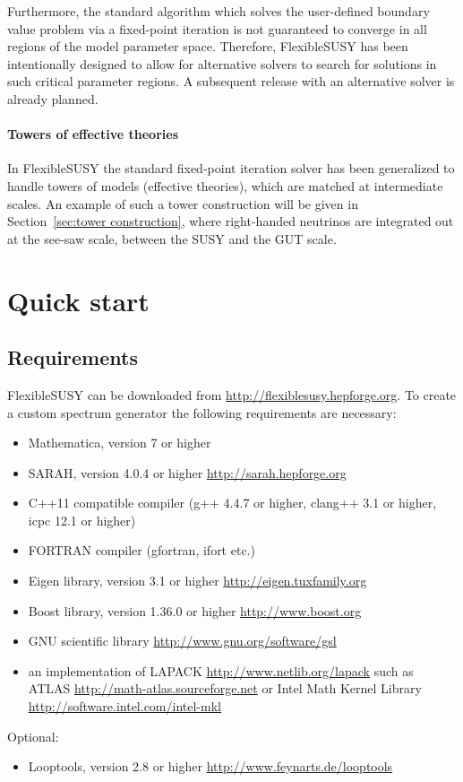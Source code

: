 \documentclass[final,3p,11pt,pdflatex]{elsarticle}
\makeatletter
\newcommand{\fs}{FlexibleSUSY\@\xspace}
\newcommand{\mathematica}{Mathematica\xspace}
\newcommand{\secref}[1]{Section~\ref{#1}}
\makeatother
\begin{document}
Furthermore, the standard algorithm which solves the user-defined
boundary value problem via a fixed-point iteration is not guaranteed
to converge in all regions of the model parameter space.  Therefore,
\fs has been intentionally designed to allow for alternative solvers
to search for solutions in such critical parameter regions.  A
subsequent release with an alternative solver is already planned.

\paragraph{Towers of effective theories}

In \fs the standard fixed-point iteration solver has been generalized
to handle towers of models (effective theories), which are matched at
intermediate scales.  An example of such a tower construction will be
given in \secref{sec:tower construction}, where right-handed neutrinos
are integrated out at the see-saw scale, between the SUSY and the GUT
scale.

\section{Quick start}
\label{sec:download}

\subsection{Requirements}

\fs can be downloaded from \url{http://flexiblesusy.hepforge.org}.  To
create a custom spectrum generator the following requirements are
necessary:
%
\begin{itemize}
\item \mathematica, version 7 or higher
\item SARAH, version 4.0.4 or higher \url{http://sarah.hepforge.org}
\item C++11 compatible compiler (g++ 4.4.7 or higher, clang++ 3.1 or
  higher, icpc 12.1 or higher)
\item FORTRAN compiler (gfortran, ifort etc.)
\item Eigen library, version 3.1 or higher
  \url{http://eigen.tuxfamily.org}
\item Boost library, version 1.36.0 or higher
  \url{http://www.boost.org}
\item GNU scientific library \url{http://www.gnu.org/software/gsl}
\item an implementation of LAPACK \url{http://www.netlib.org/lapack}
  such as ATLAS \url{http://math-atlas.sourceforge.net} or
  Intel Math Kernel Library \url{http://software.intel.com/intel-mkl}
\end{itemize}
%
Optional:
%
\begin{itemize}
\item Looptools, version 2.8 or higher
  \url{http://www.feynarts.de/looptools}
\end{itemize}
\end{document}
